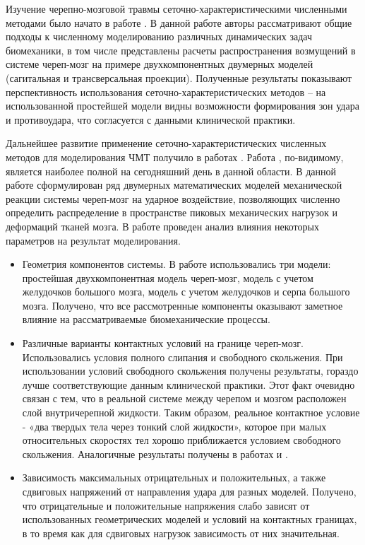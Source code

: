 Изучение черепно-мозговой травмы сеточно-характеристическими численными методами было начато в работе \cite{biomech_first}. В данной работе авторы рассматривают общие подходы к численному моделированию различных динамических задач биомеханики, в том числе представлены расчеты распространения возмущений в системе череп-мозг на примере двухкомпонентных двумерных моделей (сагитальная и трансверсальная проекции). Полученные результаты показывают перспективность использования сеточно-характеристических методов – на использованной простейшей модели видны возможности формирования зон удара и противоудара, что согласуется с данными клинической практики.

Дальнейшее развитие применение сеточно-характеристических численных методов для моделирования ЧМТ получило в работах \cite{agapov_petrov_komp_i_mozg}. Работа \cite{agapov_diser}, по-видимому, является наиболее полной на сегодняшний день в данной области. В данной работе сформулирован ряд двумерных математических моделей механической реакции системы череп-мозг на ударное воздействие, позволяющих численно определить распределение в пространстве пиковых механических нагрузок и деформаций тканей мозга. В работе проведен анализ влияния некоторых параметров на результат моделирования.

\begin{itemize}

\item Геометрия компонентов системы. В работе использовались три модели: простейшая двухкомпонентная модель череп-мозг, модель с учетом желудочков большого мозга, модель с учетом желудочков и серпа большого мозга. Получено, что все рассмотренные компоненты оказывают заметное влияние на рассматриваемые биомеханические процессы.

\item Различные варианты контактных условий на границе череп-мозг. Использовались условия полного слипания и свободного скольжения. При использовании условий свободного скольжения получены результаты, гораздо лучше соответствующие данным клинической практики. Этот факт очевидно связан с тем, что в реальной системе между черепом и мозгом расположен слой внутричерепной жидкости. Таким образом, реальное контактное условие - «два твердых тела через тонкий слой жидкости», которое при малых относительных скоростях тел хорошо приближается условием свободного скольжения. Аналогичные результаты получены в работах \cite{kuijpers} и \cite{claessens}.

\item Зависимость максимальных отрицательных и положительных, а также сдвиговых напряжений от направления удара для разных моделей. Получено, что отрицательные и положительные напряжения слабо зависят от использованных геометрических моделей и условий на контактных границах, в то время как для сдвиговых нагрузок зависимость от них значительная.

\end{itemize}


